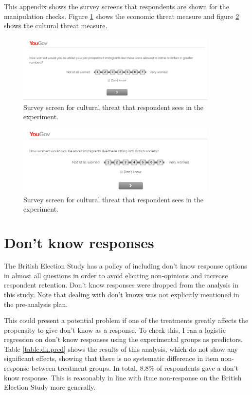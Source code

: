 \documentclass{article}\usepackage[]{graphicx}\usepackage[]{color}
\begin{document}
\begin{appendix}
This appendix shows the survey screens that respondents are shown for the manipulation checks. Figure \ref{econ_threat_screen} shows the economic threat measure and figure \ref{culture_threat_screen} shows the cultural threat measure.

\begin{figure}
\includegraphics[width=10cm]{figure/econ_threat.png}
\caption{Survey screen for cultural threat that respondent sees in the experiment.}
\label{econ_threat_screen}
\end{figure}


\begin{figure}
\includegraphics[width=10cm]{figure/culture_threat.png}
\caption{Survey screen for cultural threat that respondent sees in the experiment.}
\label{culture_threat_screen}
\end{figure}

\section{Don't know responses}
The British Election Study has a policy of including don't know response options in almost all questions in order to avoid eliciting non-opinions and increase respondent retention. Don't know responses were dropped from the analysis in this study. Note that dealing with don't knows was not explicitly mentioned in the pre-analysis plan. 

This could present a potential problem if one of the treatments greatly affects the propensity to give don't know as a response. To check this, I ran a logistic regression on don't know responses using the experimental groups as predictors. Table \ref{table:dk.pred} shows the results of this analysis, which do not show any significant effects, showing that there is no systematic difference in item non-response between treatment groups. In total, 8.8\% of respondents gave a don't know response. This is reasonably in line with itme non-response on the British Election Study more generally. 



\end{appendix}
\end{document}

